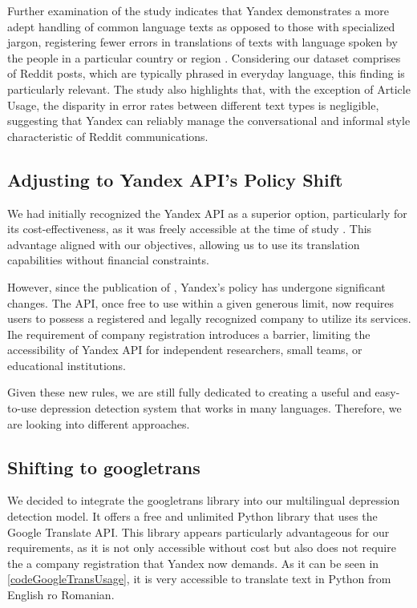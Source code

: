 Further examination of the study indicates that Yandex demonstrates a more adept handling of common language texts as opposed to those with specialized jargon, registering fewer errors in translations of texts with language spoken by the people in a particular country or region \cite{cambedda2021study}. Considering our dataset comprises of Reddit posts, which are typically phrased in everyday language, this finding is particularly relevant. The study also highlights that, with the exception of Article Usage, the disparity in error rates between different text types is negligible, suggesting that Yandex can reliably manage the conversational and informal style characteristic of Reddit communications.

\subsection{Adjusting to Yandex API's Policy Shift}

\quad We had initially recognized the Yandex API as a superior option, particularly for its cost-effectiveness, as it was freely accessible at the time of study \cite{rashmi2020comparison}. This advantage aligned with our objectives, allowing us to use its translation capabilities without financial constraints.

However, since the publication of \cite{rashmi2020comparison}, Yandex's policy has undergone significant changes. The API, once free to use within a given generous limit, now requires users to possess a registered and legally recognized company to utilize its services. Ihe requirement of company registration introduces a barrier, limiting the accessibility of Yandex API for independent researchers, small teams, or educational institutions.

Given these new rules, we are still fully dedicated to creating a useful and easy-to-use depression detection system that works in many languages. Therefore, we are looking into different approaches.

\subsection{Shifting to googletrans}

\quad We decided to integrate the googletrans library \cite{googletranslib} into our multilingual depression detection model. It offers a free and unlimited Python library that uses the Google Translate API. This library appears particularly advantageous for our requirements, as it is not only accessible without cost but also does not require the a company registration that Yandex now demands. As it can be seen in \ref{codeGoogleTransUsage}, it is very accessible to translate text in Python from English ro Romanian.

